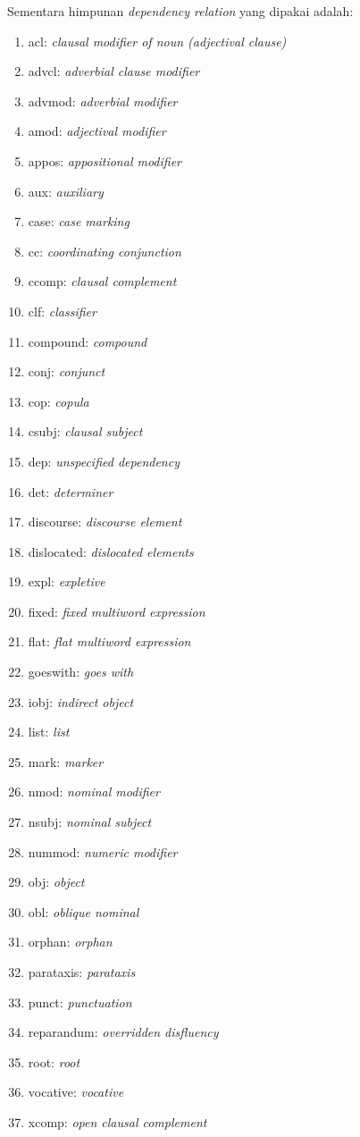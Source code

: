Sementara himpunan \textit{dependency relation} yang dipakai adalah:

\begin{multicols}{2}
	\begin{enumerate}
		\item acl: \textit{clausal modifier of noun (adjectival clause)}
		\item advcl: \textit{adverbial clause modifier}
		\item advmod: \textit{adverbial modifier}
		\item amod: \textit{adjectival modifier}
		\item appos: \textit{appositional modifier}
		\item aux: \textit{auxiliary}
		\item case: \textit{case marking}
		\item cc: \textit{coordinating conjunction}
		\item ccomp: \textit{clausal complement}
		\item clf: \textit{classifier}
		\item compound: \textit{compound}
		\item conj: \textit{conjunct}
		\item cop: \textit{copula}
		\item csubj: \textit{clausal subject}
		\item dep: \textit{unspecified dependency}
		\item det: \textit{determiner}
		\item discourse: \textit{discourse element}
		\item dislocated: \textit{dislocated elements}
		\item expl: \textit{expletive}
		\item fixed: \textit{fixed multiword expression}
		\item flat: \textit{flat multiword expression}
		\item goeswith: \textit{goes with}
		\item iobj: \textit{indirect object}
		\item list: \textit{list}
		\item mark: \textit{marker}
		\item nmod: \textit{nominal modifier}
		\item nsubj: \textit{nominal subject}
		\item nummod: \textit{numeric modifier}
		\item obj: \textit{object}
		\item obl: \textit{oblique nominal}
		\item orphan: \textit{orphan}
		\item parataxis: \textit{parataxis}
		\item punct: \textit{punctuation}
		\item reparandum: \textit{overridden disfluency}
		\item root: \textit{root}
		\item vocative: \textit{vocative}
		\item xcomp: \textit{open clausal complement}
	\end{enumerate}
\end{multicols}

